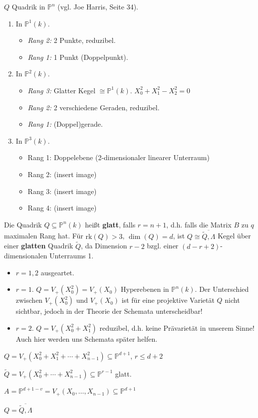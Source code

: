 \begin{example}
  $Q$ Quadrik in $\mathbb{P}^{n}$ (vgl. Joe Harris, Seite 34).
  \begin{enumerate}
  \item In $\mathbb{P}^{1}(k)$. 
    \begin{itemize}
    \item \emph{Rang 2:} 2 Punkte, reduzibel. 
    \item \emph{Rang 1:} 1 Punkt (Doppelpunkt). 
    \end{itemize}
  \item In $\mathbb{P}^{2}(k)$.
    \begin{itemize}
    \item \emph{Rang 3:} Glatter Kegel
      $\cong\mathbb{P}^{1}(k)$. $X_{0}^{2}+X_{1}^{2}-X_{2}^{2}=0$
    \item \emph{Rang 2:} 2 verschiedene Geraden, reduzibel. 
    \item \emph{Rang 1:} (Doppel)gerade.
    \end{itemize}
  \item In $\mathbb{P}^{3}(k)$.
    \begin{itemize}
    \item Rang 1: Doppelebene (2-dimensionaler linearer Unterraum)
    \item Rang 2: (insert image)
    \item Rang 3: (insert image)
    \item Rang 4: (insert image)
    \end{itemize}
  \end{enumerate}
\end{example}
Die Quadrik $Q\subseteq\mathbb{P}^{n}(k)$ heißt \textbf{glatt}, falls
$r=n+1$, d.h. falls die Matrix $B$ zu $q$ maximalen Rang hat. Für
$\text{rk}(Q)>3$, $\dim(Q)=d$, ist
$Q\cong\overline{\widetilde{Q},\Lambda}$ Kegel über einer
\textbf{glatten} Quadrik $\widetilde{Q}$, da Dimension $r-2$
bzgl. einer $(d-r+2)$-dimensionalen Unterraums 1.
\begin{itemize}
\item $r=1,2$ ausgeartet.
\item $r=1$. $Q=V_{+}(X_{0}^{2})=V_{+}(X_{0})$ Hyperebenen in
  $\mathbb{P}^{n}(k)$.  Der Unterschied zwischen $V_{+}(X_{0}^{2})$
  und $V_{+}(X_{0})$ ist für eine projektive Varietät $Q$ nicht
  sichtbar, jedoch in der Theorie der Schemata unterscheidbar!
\item $r=2$. $Q=V_{+}(X_{0}^{2}+X_{1}^{2})$ reduzibel, d.h. keine
  Prävarietät in unserem Sinne! Auch hier werden uns Schemata später helfen.
\end{itemize}
\medskip{}

$Q=V_{+}(X_{0}^{2}+X_{1}^{2}+\cdots+X_{n-1}^{2})\subseteq\mathbb{P}^{d+1}$,
$r\leq d+2$

$\tilde{Q}=V_{+}(X_{0}^{2}+\cdots+X_{n-1}^{2})\subseteq\mathbb{P}^{r-1}$
glatt.

$A=\mathbb{P}^{d+1-v}=V_{+}(X_{0},\ldots,X_{n-1})\subseteq\mathbb{P}^{d+1}$

$Q=\overline{\widetilde{Q},\Lambda}$
